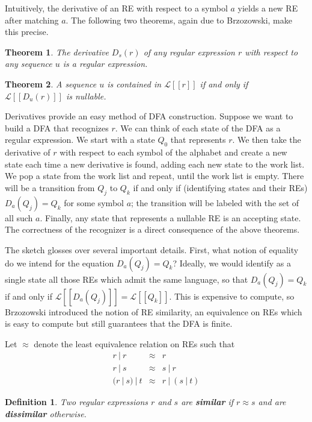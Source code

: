 \documentclass[11pt]{article}
\newcommand{\RE}{r}
\newcommand{\OR}{\ | \ }
\newcommand{\CL}{\mathcal{L}}
\newcommand{\Sem}[1]{[ \! [ #1 ] \! ]}
\newcommand{\Ls}[1]{\CL\Sem{#1}}
\newcommand{\New}[1]{\emph{\textbf{#1}}}
\newtheorem*{theorem}{Theorem}
\newtheorem*{definition}{Definition}
\begin{document}
Intuitively, the derivative of an RE with respect to a symbol $a$ yields a new RE after matching $a$.  The following two theorems, again due to Brzozowski, make this precise.

\begin{theorem} The derivative $D_s(\RE)$ of any regular expression $\RE$ with respect to any sequence $u$ is a regular expression.
\end{theorem}

\begin{theorem} A sequence $u$ is contained in $\Ls{\RE}$ if and only if $\Ls{D_u(\RE)}$ is nullable.
\end{theorem}

Derivatives provide an easy method of DFA construction.  Suppose we want to build a DFA that recognizes $\RE$.  We can think of each state of the DFA as a regular expression.  We start with a state $Q_0$ that represents $\RE$.  We then take the derivative of $\RE$ with respect to each symbol of the alphabet and create a new state each time a new derivative is found, adding each new state to the work list.  We pop a state from the work list and repeat, until the work list is empty.  There will be a transition from $Q_j$ to $Q_k$ if and only if (identifying states and their REs) $D_a (Q_j) = Q_k$ for some symbol $a$; the transition will be labeled with the set of all such $a$.  Finally, any state that represents a nullable RE is an accepting state.  The correctness of the recognizer is a direct consequence of the above theorems.

The sketch glosses over several important details.  First, what notion of equality do we intend for the equation $D_a (Q_j) = Q_k$?  Ideally, we would identify as a single state all those REs which admit the same language, so that $D_a (Q_j) = Q_k$ if and only if $\Ls{D_a (Q_j)} = \Ls{Q_k}$.  This is expensive to compute, so Brzozowski introduced the notion of RE similarity, an equivalence on REs which is easy to compute but still guarantees that the DFA is finite.

Let $\approx$ denote the least equivalence relation on REs such that
\begin{eqnarray*}
r \OR r &\approx& r \\
r \OR s &\approx& s \OR r \\
(r \OR s) \OR t &\approx& r \OR (s \OR t)
\end{eqnarray*}

\begin{definition} Two regular expressions $r$ and $s$ are \New{similar} if $r \approx s$ and are \New{dissimilar} otherwise.
\end{definition}
\end{document}
